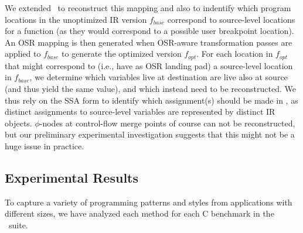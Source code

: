 \noindent We extended \tinyvm\ to reconstruct this mapping and also to indentify which program locations in the unoptimized IR version $f_{base}$ correspond to source-level locations for a function (as they would correspond to a possible user breakpoint location). An OSR mapping is then generated when OSR-aware transformation passes are applied to $f_{base}$ to generate the optimized version $f_{opt}$. For each location in $f_{opt}$ that might correspond to (i.e., have as OSR landing pad) a source-level location in $f_{base}$, we determine which variables live at destination are live also at source (and thus yield the same value), and which instead need to be reconstructed. We thus rely on the SSA form to identify which assignment(s) should be made in \reconstruct, as distinct assignments to source-level variables are represented by distinct IR objects. $\phi$-nodes at control-flow merge points of course can not be reconstructed, but our preliminary experimental investigation suggests that this might not be a huge issue in practice.

\missing %


\subsection{Experimental Results}
To capture a variety of programming patterns and styles from applications with different sizes, we have analyzed each method for each C benchmark in the \speccpu\ suite.

